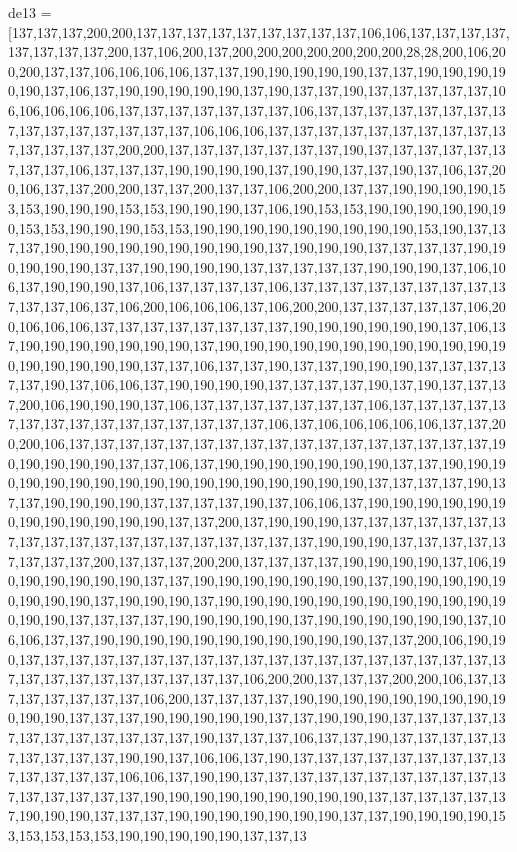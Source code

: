 de13 = [137,137,137,200,200,137,137,137,137,137,137,137,137,137,106,106,137,137,137,137,137,137,137,137,200,137,106,200,137,200,200,200,200,200,200,200,28,28,200,106,200,200,137,137,106,106,106,106,137,137,190,190,190,190,190,137,137,190,190,190,190,190,137,106,137,190,190,190,190,190,137,190,137,137,190,137,137,137,137,137,106,106,106,106,106,137,137,137,137,137,137,137,106,137,137,137,137,137,137,137,137,137,137,137,137,137,137,137,106,106,106,137,137,137,137,137,137,137,137,137,137,137,137,137,137,200,200,137,137,137,137,137,137,137,190,137,137,137,137,137,137,137,137,106,137,137,137,190,190,190,190,137,190,190,137,137,190,137,106,137,200,106,137,137,200,200,137,137,200,137,137,106,200,200,137,137,190,190,190,190,153,153,190,190,190,153,153,190,190,190,137,106,190,153,153,190,190,190,190,190,190,153,153,190,190,190,153,153,190,190,190,190,190,190,190,190,190,153,190,137,137,137,190,190,190,190,190,190,190,190,190,137,190,190,190,137,137,137,137,190,190,190,190,190,137,137,190,190,190,190,137,137,137,137,137,190,190,190,137,106,106,137,190,190,190,137,106,137,137,137,137,106,137,137,137,137,137,137,137,137,137,137,137,106,137,106,200,106,106,106,137,106,200,200,137,137,137,137,137,106,200,106,106,106,137,137,137,137,137,137,137,137,190,190,190,190,190,190,137,106,137,190,190,190,190,190,190,190,137,190,190,190,190,190,190,190,190,190,190,190,190,190,190,190,190,190,137,137,106,137,137,190,137,137,190,190,190,137,137,137,137,137,190,137,106,106,137,190,190,190,190,137,137,137,137,190,137,190,137,137,137,200,106,190,190,190,137,106,137,137,137,137,137,137,137,106,137,137,137,137,137,137,137,137,137,137,137,137,137,137,137,106,137,106,106,106,106,106,137,137,200,200,106,137,137,137,137,137,137,137,137,137,137,137,137,137,137,137,137,137,190,190,190,190,190,137,137,106,137,190,190,190,190,190,190,190,137,137,190,190,190,190,190,190,190,190,190,190,190,190,190,190,190,190,190,137,137,137,137,190,137,137,190,190,190,190,137,137,137,137,190,137,106,106,137,190,190,190,190,190,190,190,190,190,190,190,190,137,137,200,137,190,190,190,137,137,137,137,137,137,137,137,137,137,137,137,137,137,137,137,137,137,137,190,190,190,137,137,137,137,137,137,137,137,200,137,137,137,200,200,137,137,137,137,190,190,190,190,137,106,190,190,190,190,190,190,137,137,190,190,190,190,190,190,190,137,190,190,190,190,190,190,190,190,137,190,190,190,137,190,190,190,190,190,190,190,190,190,190,190,190,190,190,137,137,137,137,190,190,190,190,190,137,190,190,190,190,190,190,137,106,106,137,137,190,190,190,190,190,190,190,190,190,190,190,137,137,200,106,190,190,137,137,137,137,137,137,137,137,137,137,137,137,137,137,137,137,137,137,137,137,137,137,137,137,137,137,137,137,137,106,200,200,137,137,137,200,200,106,137,137,137,137,137,137,137,106,200,137,137,137,137,190,190,190,190,190,190,190,190,190,190,190,137,137,137,190,190,190,190,190,137,137,190,190,190,137,137,137,137,137,137,137,137,137,137,137,137,190,137,137,137,106,137,137,190,137,137,137,137,137,137,137,137,137,190,190,137,106,106,137,190,137,137,137,137,137,137,137,137,137,137,137,137,137,106,106,137,190,190,137,137,137,137,137,137,137,137,137,137,137,137,137,137,137,137,190,190,190,190,190,190,190,190,190,137,137,137,137,137,137,190,190,190,137,137,137,190,190,190,190,190,190,190,137,137,190,190,190,190,153,153,153,153,153,190,190,190,190,190,137,137,13